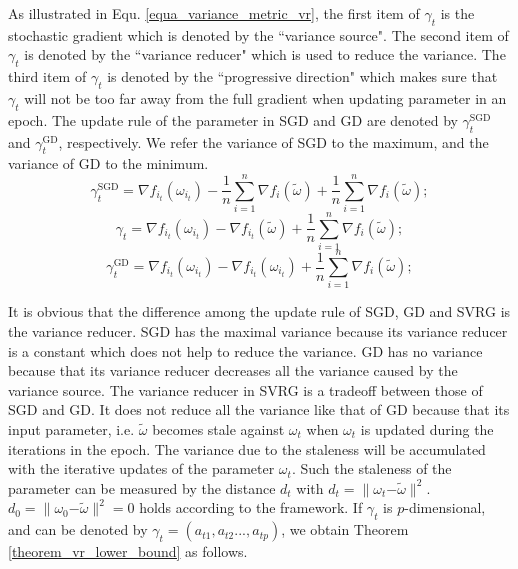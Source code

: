 \documentclass[letterpaper]{article}
\begin{document}
As illustrated in Equ. \ref{equa_variance_metric_vr}, the first item of $\gamma_t$ is the stochastic gradient which is denoted by the ``variance source". The second item of $\gamma_t$ is denoted by the ``variance reducer" which is used to reduce the variance. The third item of $\gamma_t$ is denoted by the ``progressive direction" which makes sure that $\gamma_t$ will not be too far away from the full gradient when updating parameter in an epoch. The update rule of the parameter in SGD and GD are denoted by $\gamma_t^{\text{SGD}}$ and $\label{equa_variance_metric_gd}
\gamma_t^{\text{GD}}$, respectively.  We refer the variance of SGD to the maximum, and  the variance of GD to the minimum. 
\begin{equation}
\label{equa_variance_metric_sgd}
 \gamma_t^{\text{SGD}}=\nabla f_{i_t}(\omega_{i_t})-\frac{1}{n}\sum\limits_{i=1}^n\nabla f_i(\tilde{\omega})+\frac{1}{n}\sum\limits_{i=1}^n\nabla f_i(\tilde{\omega});
\end{equation}
\begin{equation}
\label{equa_variance_metric_vr}
\gamma_t=\nabla f_{i_t}(\omega_{i_t})-\nabla f_{i_t}(\tilde{\omega})+\frac{1}{n}\sum\limits_{i=1}^n\nabla f_i(\tilde{\omega});
\end{equation}
\begin{equation}
\label{equa_variance_metric_gd}
\gamma_t^{\text{GD}}=\nabla f_{i_t}(\omega_{i_t})-\nabla f_{i_t}(\omega_{i_t})+\frac{1}{n}\sum\limits_{i=1}^n\nabla f_i(\tilde{\omega});
\end{equation}

It is obvious that the difference among the update rule of SGD, GD and SVRG is the variance reducer. SGD has the maximal variance because its variance reducer  is a constant which does not help to reduce the variance. GD has no variance because that its variance reducer decreases all the variance caused by the variance source. The variance reducer in SVRG is a tradeoff  between those of SGD and GD. It does not reduce all the variance like that of GD because that its input parameter, i.e. $\tilde{\omega}$ becomes stale against $\omega_{t}$  when   $\omega_{t}$  is updated during the iterations in the epoch. The variance due to the staleness will be accumulated with the iterative updates of the parameter $\omega_{t}$.   Such the staleness of the parameter can be measured by  the distance $d_t$ with $d_t = \parallel \omega_{t} \mathrm{-} \tilde{\omega} \parallel^2$. $d_0 = \parallel \omega_{0}\mathrm{-}\tilde{\omega}\parallel^2 = 0$ holds according to the framework. If $\gamma_t$ is $p$-dimensional, and can be denoted by  $\gamma_t = (a_{t1}, a_{t2}..., a_{tp})$, we obtain Theorem \ref{theorem_vr_lower_bound}  as follows.
\end{document}
